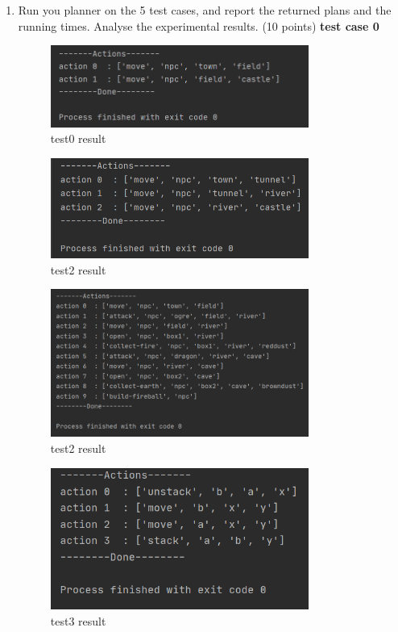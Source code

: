 \documentclass[a4paper, 11pt]{article}
\begin{document}
\begin{enumerate}
\item Run you planner on the 5 test cases, and report the returned plans and the running times. Analyse the experimental results. (10 points)
\textbf{test case 0}
	\begin{figure}[H]
	\centering
	\includegraphics[width=0.8\textwidth]{Pic/test0.png}
	\caption{test0 result}
	\end{figure}
	

	\begin{figure}[H]
	\centering
	\includegraphics[width=0.8\textwidth]{Pic/test1.png}
	\caption{test2 result}
	\end{figure}
	

	\begin{figure}[H]
	\centering
	\includegraphics[width=0.8\textwidth]{Pic/test2.png}
	\caption{test2 result}
	\end{figure}
	

	\begin{figure}[H]
	\centering
	\includegraphics[width=0.8\textwidth]{Pic/test3.png}
	\caption{test3 result}
	\end{figure}
	


\end{enumerate}
\end{document}
